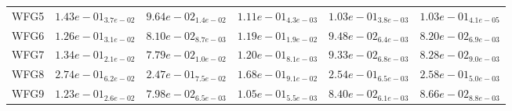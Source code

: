 \documentclass{article}
\begin{document}
\begin{table}
\begin{scriptsize}
\begin{tabular}{llllll}
WFG5 & $  1.43e-01_{ 3.7e-02}$ & \cellcolor{gray95}$  9.64e-02_{ 1.4e-02}$ & $  1.11e-01_{ 4.3e-03}$ & $  1.03e-01_{ 3.8e-03}$ & \cellcolor{gray25}$  1.03e-01_{ 4.1e-05}$ \\
WFG6 & $  1.26e-01_{ 3.1e-02}$ & \cellcolor{gray95}$  8.10e-02_{ 8.7e-03}$ & $  1.19e-01_{ 1.9e-02}$ & $  9.48e-02_{ 6.4e-03}$ & \cellcolor{gray25}$  8.20e-02_{ 6.9e-03}$ \\
WFG7 & $  1.34e-01_{ 2.1e-02}$ & \cellcolor{gray95}$  7.79e-02_{ 1.0e-02}$ & $  1.20e-01_{ 8.1e-03}$ & $  9.33e-02_{ 6.8e-03}$ & \cellcolor{gray25}$  8.28e-02_{ 9.0e-03}$ \\
WFG8 & $  2.74e-01_{ 6.2e-02}$ & \cellcolor{gray25}$  2.47e-01_{ 7.5e-02}$ & \cellcolor{gray95}$  1.68e-01_{ 9.1e-02}$ & $  2.54e-01_{ 6.5e-03}$ & $  2.58e-01_{ 5.0e-03}$ \\
WFG9 & $  1.23e-01_{ 2.6e-02}$ & \cellcolor{gray95}$  7.98e-02_{ 6.5e-03}$ & $  1.05e-01_{ 5.5e-03}$ & \cellcolor{gray25}$  8.40e-02_{ 6.1e-03}$ & $  8.66e-02_{ 8.8e-03}$ \\
\hline
\end{tabular}
\end{scriptsize}
\end{table}
\end{document}
